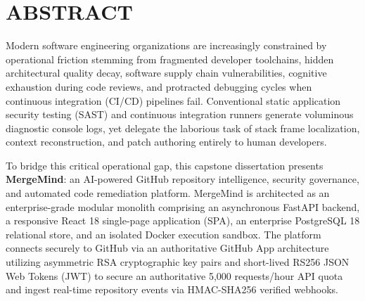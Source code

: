 \chapter*{ABSTRACT}

Modern software engineering organizations are increasingly constrained by operational friction stemming from fragmented developer toolchains, hidden architectural quality decay, software supply chain vulnerabilities, cognitive exhaustion during code reviews, and protracted debugging cycles when continuous integration (CI/CD) pipelines fail. Conventional static application security testing (SAST) and continuous integration runners generate voluminous diagnostic console logs, yet delegate the laborious task of stack frame localization, context reconstruction, and patch authoring entirely to human developers.

\vspace{0.4cm}
To bridge this critical operational gap, this capstone dissertation presents \textbf{MergeMind}: an AI-powered GitHub repository intelligence, security governance, and automated code remediation platform. MergeMind is architected as an enterprise-grade modular monolith comprising an asynchronous FastAPI backend, a responsive React 18 single-page application (SPA), an enterprise PostgreSQL 18 relational store, and an isolated Docker execution sandbox. The platform connects securely to GitHub via an authoritative GitHub App architecture utilizing asymmetric RSA cryptographic key pairs and short-lived RS256 JSON Web Tokens (JWT) to secure an authoritative 5,000 requests/hour API quota and ingest real-time repository events via HMAC-SHA256 verified webhooks.

